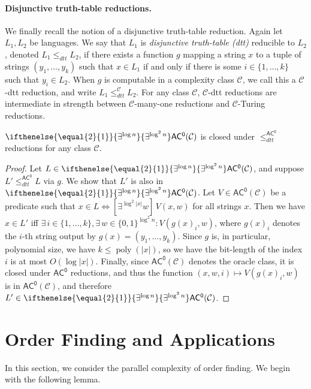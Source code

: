 \documentclass{article}
\newcommand{\betacc}[1]{\ifthenelse{\equal{#1}{1}}{\exists^{\log n}}{\exists^{\log^{#1}n}}} %
\DeclareMathOperator{\poly}{poly}
\newcommand*{\ComplexityClass}[1]{\ensuremath{\mathsf{#1}}\xspace}
\newcommand{\ACz}{\ComplexityClass{AC^0}}
\begin{document}
\paragraph{Disjunctive truth-table reductions.} We finally recall the notion of a disjunctive truth-table reduction. Again let $L_{1}, L_{2}$ be languages. We say that $L_{1}$ is \textit{disjunctive truth-table (dtt)} reducible to $L_{2}$, denoted $L_{1} \leq_{dtt} L_{2}$, if there exists a function $g$ mapping a string $x$ to a tuple of strings $(y_{1}, \ldots, y_{k})$ such that $x \in L_1$ if and only if there is some $i \in \{1,\dots, k\}$ such that $y_i \in L_2$. When $g$ is computable in a complexity class $\mathcal{C}$, we call this a $\mathcal{C}$-dtt reduction, and write $L_1 \leq_{dtt}^\mathcal{C} L_2$. For any class $\mathcal{C}$, $\mathcal{C}$-dtt reductions are intermediate in strength between $\mathcal{C}$-many-one reductions and $\mathcal{C}$-Turing reductions. 

\begin{fact} \label{fact:dtt}
$\betacc{2} \ACz(\mathcal{C})$ is closed under $\leq_{dtt}^\ACz$ reductions for any class $\mathcal{C}$.
\end{fact}

\begin{proof}
Let $L \in \betacc{2}\ACz(\mathcal{C})$, and suppose $L' \leq_{dtt}^\ACz L$ via $g$. We show that $L'$ is also in $\betacc{2}\ACz(\mathcal{C})$. Let $V \in \ACz(\mathcal{C})$ be a predicate such that $x \in L \iff [\exists^{\log^2 |x|} w] \,V(x,w)$ for all strings $x$.
Then we have $x \in L'$ iff $\exists\, i \in \{1, \dots, k\}, \exists\, w \in \{0,1\}^{\log^2 n}: V(g(x)_i, w)$, where $g(x)_i$ denotes the $i$-th string output by $g(x)=(y_1,\dotsc,y_k)$. Since $g$ is, in particular, polynomial size, we have $k \leq \poly(|x|)$, so we have the bit-length of the index $i$ is at most $O(\log|x|)$. Finally, since $\ACz(\mathcal{C})$ denotes the oracle class, it is closed under $\ACz$ reductions, and thus the function $(x,w,i) \mapsto V(g(x)_i, w)$ is in $\ACz(\mathcal{C})$, and therefore $L' \in \betacc{2}\ACz(\mathcal{C})$.
\end{proof}

\section{Order Finding and Applications}

In this section, we consider the parallel complexity of order finding. We begin with the following lemma.
\end{document}
